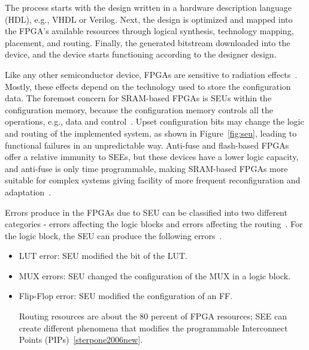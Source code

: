 The process starts with the design written
in a hardware description language (HDL), e.g., VHDL or Verilog. Next, the design is optimized and mapped into the FPGA’s available resources through logical synthesis,
technology mapping, placement, and routing. Finally, the generated bitstream downloaded into the device, and the device starts functioning according to the designer design.


Like any other semiconductor device, FPGAs are sensitive to radiation effects~\citep{hobeika2014multi}.
Mostly, these effects depend on the technology used to store the configuration data.
The foremost concern for SRAM-based FPGAs is
SEUs within the configuration memory, because the configuration memory controls all the operations, e.g., data and control~\citep{manuzzato2010single}.
Upset configuration bits may change the logic and routing of the implemented system, as
shown in Figure~\ref{fig:seu}, leading to functional failures in an unpredictable way. Anti-fuse and flash-based
FPGAs offer a relative immunity to SEEs, but these devices have a lower logic capacity, and anti-fuse is only time programmable, making SRAM-based FPGAs more
suitable for complex systems giving facility of more frequent reconfiguration and adaptation~\citep{quinn2015validation, violante2004simulation}. 

Errors produce in the FPGAs due to SEU can be classified into two different categories - errors affecting the logic blocks and errors affecting the routing~\citep{sterpone2006new}. For the logic block, the SEU can produce the following errors~\citep{sterpone2006new}.

\begin{itemize}
\item LUT error: SEU modified the bit of the LUT.

\item MUX errors: SEU changed the configuration of the MUX in a logic block.

\item Flip-Flop error: SEU modified the configuration of an FF.

Routing resources are about the 80 percent of FPGA resources; SEE can create different phenomena that modifies the programmable Interconnect Points (PIPs)~\ref{sterpone2006new}.

\end{itemize}



